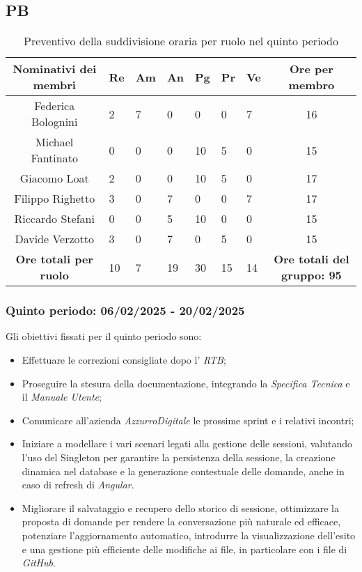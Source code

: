 \newpage
\subsection{PB}
\begin{table}[h!]
    \centering
    \renewcommand{\arraystretch}{1.5}
    \begin{tabularx}{\textwidth}{|c|X|X|X|X|X|X|c|}\hline
    \rowcolor[HTML]{FFD700} 
    \textbf{Nominativi dei membri} & \textbf{Re} & \textbf{Am} & \textbf{An} & \textbf{Pg} & \textbf{Pr} & \textbf{Ve} & \textbf{Ore per membro} \\ \hline
    Federica Bolognini  & 2 & 7 & 0 & 0 & 0 & 7 & 16 \\ \hline
    Michael Fantinato   & 0 & 0 & 0 & 10 & 5 & 0 & 15  \\ \hline
    Giacomo Loat        & 2 & 0 & 0 & 10 & 5 & 0 & 17  \\ \hline
    Filippo Righetto    & 3 & 0 & 7 & 0 & 0 & 7 & 17 \\ \hline
    Riccardo Stefani    & 0 & 0 & 5 & 10 & 0 & 0 & 15 \\ \hline
    Davide Verzotto     & 3 & 0 & 7 & 0 & 5 & 0 & 15  \\ \hline
    \rowcolor[HTML]{FFD700} 
    \textbf{Ore totali per ruolo} & 10 & 7 & 19 & 30 & 15 & 14 & \textbf{Ore totali del gruppo: 95} \\ \hline
    \end{tabularx}
    \caption{Preventivo della suddivisione oraria per ruolo nel quinto periodo}
\end{table}

\subsubsection{Quinto periodo: 06/02/2025 - 20/02/2025}
\label{sec:prev_cons_quinto_periodo}  
Gli obiettivi fissati per il quinto periodo sono:
\begin{itemize}
    \item Effettuare le correzioni consigliate dopo l' \emph{RTB};
    \item Proseguire la stesura della documentazione, integrando la \emph{Specifica Tecnica} e il \emph{Manuale Utente};
    \item Comunicare all'azienda \emph{AzzurroDigitale} le prossime sprint e i relativi incontri;
    \item Iniziare a modellare i vari scenari legati alla gestione delle sessioni, valutando l’uso del Singleton per garantire la persistenza della sessione, la creazione dinamica nel database e la generazione contestuale delle domande, anche in caso di refresh di \emph{Angular}.
    \item Migliorare il salvataggio e recupero dello storico di sessione, ottimizzare la proposta di domande per rendere la conversazione più naturale ed efficace, potenziare l’aggiornamento automatico, introdurre la visualizzazione dell’esito e una gestione più efficiente delle modifiche ai file, in particolare con i file di \emph{GitHub}.
\end{itemize}

